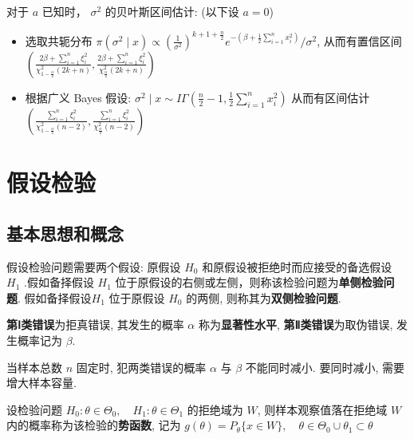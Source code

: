 \documentclass[10pt]{yerbaformat}
\begin{document}
\par 对于 $a$ 已知时， $\sigma^{2}$ 的贝叶斯区间估计: (以下设 $a=0$)

\begin{itemize}
    \item 选取共轭分布 $\pi\left(\sigma^{2} \mid x\right) \propto \left(\frac{1}{\sigma^{2}}\right)^{k+1+\frac{n}{2}} e^{-\left(\beta+\frac{1}{2} \sum_{i=1}^{n} x_{i}^{2}\right)} / \sigma^{2}$, 从而有置信区间 $\left(\frac{2 \beta+\sum_{i=1}^{n} \xi_{i}^{2}}{\chi_{1-\frac{\alpha}{2}}^{2}(2 k+n)}, \frac{2 \beta+\sum_{i=1}^{n} \xi_{i}^{2}}{\chi_{\frac{\alpha}{2}}^{2}(2 k+n)}\right)$
    \item 根据广义 Bayes 假设: $\sigma^{2} \mid x \sim I \Gamma\left(\frac{n}{2}-1, \frac{1}{2} \sum_{i=1}^{n} x_{i}^{2}\right)$ 从而有区间估计 $\left(\frac{\sum_{i=1}^{n} \xi_{i}^{2}}{\chi_{1-\frac{\alpha}{2}}^{2}(n-2)}, \frac{\sum_{i=1}^{n} \xi_{i}^{2}}{\chi_{\frac{\alpha}{2}}^{2}(n-2)}\right)$
\end{itemize}

\section{假设检验}

\subsection{基本思想和概念}

\begin{definition}
    假设检验问题需要两个假设: 原假设 $H_0$ 和原假设被拒绝时而应接受的备选假设 $H_1$ .假如备择假设 $H_{1}$ 位于原假设的右侧或左侧，则称该检验问题为\textbf{单侧检验问题}. 假如备择假设$H_1$ 位于原假设 $H_0$ 的两侧, 则称其为\textbf{双侧检验问题}.
\end{definition}

\begin{definition}[错误类别]
    \textbf{第Ⅰ类错误}为拒真错误, 其发生的概率 $\alpha$ 称为\textbf{显著性水平}, \textbf{第Ⅱ类错误}为取伪错误, 发生概率记为 $\beta$.
\end{definition}

\par 当样本总数 $n$ 固定时, 犯两类错误的概率 $\alpha$ 与 $\beta$ 不能同时减小. 要同时减小, 需要增大样本容量.

\begin{definition}
    设检验问题 $H_{0}: \theta \in \Theta_{0}, \quad H_{1}: \theta \in \Theta_{1}$ 的拒绝域为 $W$, 则样本观察值落在拒绝域 $W$ 内的概率称为该检验的\textbf{势函数}, 记为 $g(\theta)=P_{\theta}\{x \in W\}, \quad \theta \in \Theta_{0} \cup \theta_{1} \subset \theta $
\end{definition}
\end{document}
